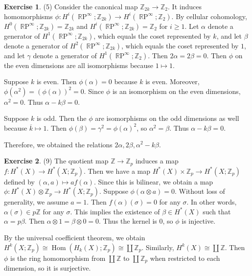 \documentclass[12pt, psamsfonts]{amsart}
\theoremstyle{definition}
\newtheorem*{exer}{Exercise}
\theoremstyle{remark}
\DeclareMathOperator{\Hom}{Hom}
\DeclareMathOperator{\RP}{\mathbb{R}P}
\numberwithin{equation}{section}
\begin{document}
\begin{exer}{(5)}
  Consider the canonical map $\mathbb{Z}_{2k} \rightarrow \mathbb{Z}_2$.
  It induces homomorphisms $\phi: H^i(\RP^{\infty};\mathbb{Z}_{2k}) \rightarrow H^i(\RP^{\infty};\mathbb{Z}_{2})$.
  By cellular cohomology, $H^0(\RP^{\infty}; \mathbb{Z}_{2k}) = \mathbb{Z}_{2k}$ and $H^i(\RP^{\infty}; \mathbb{Z}_{2k}) = \mathbb{Z}_2$ for $i \geq 1$.
  Let $\alpha$ denote a generator of $H^1(\RP^{\infty};\mathbb{Z}_{2k})$, which equals the coset represented by $k$, and let $\beta$ denote a generator of $H^2(\RP^{\infty}; \mathbb{Z}_{2k})$, which equals the coset represented by $1$, and let $\gamma$ denote a generator of $H^1(\RP^{\infty}; \mathbb{Z}_2)$.
  Then $2\alpha = 2\beta = 0$.
  Then $\phi$ on the even dimensions are all isomorphisms because $1 \mapsto 1$.

  Suppose $k$ is even.
  Then $\phi(\alpha) = 0$ because $k$ is even.
  Moreover, $\phi(\alpha^2) = (\phi(\alpha))^2 = 0$.
  Since $\phi$ is an isomorphism on the even dimensions, $\alpha^2 = 0$.
  Thus $\alpha - k\beta = 0$.

  Suppose $k$ is odd.
  Then the $\phi$ are isomorphisms on the odd dimensions as well because $\overline{k} \mapsto 1$.
  Then $\phi(\beta) = \gamma^2 = \phi(\alpha)^2$, so $\alpha^2 = \beta$.
  Thus $\alpha - k\beta = 0$.

  Therefore, we obtained the relations $2\alpha, 2\beta, \alpha^2 - k\beta$.
\end{exer}

\begin{exer}{(9)}
  The quotient map $\mathbb{Z} \rightarrow \mathbb{Z}_p$ induces a map $f: H^{\ast}(X) \rightarrow H^{\ast}(X; \mathbb{Z}_p)$.
  Then we have a map $H^{\ast}(X) \times \mathbb{Z}_p \rightarrow H^{\ast}(X; \mathbb{Z}_p)$ defined by $(\alpha, a) \mapsto af(\alpha)$.
  Since this is bilinear, we obtain a map $\phi: H^{\ast}(X) \otimes \mathbb{Z}_p \rightarrow H^{\ast}(X; \mathbb{Z}_p)$.
  Suppose $\phi(\alpha \otimes a) = 0$.
  Without loss of generality, we assume $a = 1$.
  Then $f(\alpha)(\sigma) = 0$ for any $\sigma$.
  In other words, $\alpha(\sigma) \in p\mathbb{Z}$ for any $\sigma$.
  This implies the existence of $\beta \in H^{\ast}(X)$ such that $\alpha = p\beta$.
  Then $\alpha \otimes 1 = \beta \otimes 0 = 0$.
  Thus the kernel is 0, so $\phi$ is injective.

  By the universal coefficient theorem, we obtain $H^k(X; \mathbb{Z}_p) \cong \Hom(H_k(X); \mathbb{Z}_p) \cong \coprod \mathbb{Z}_p$.
  Similarly, $H^k(X) \cong \coprod \mathbb{Z}$.
  Then $\phi$ is the ring homomorphism from $\coprod \mathbb{Z}$ to $\coprod \mathbb{Z}_p$ when restricted to each dimension, so it is surjective.
\end{exer}
\end{document}
